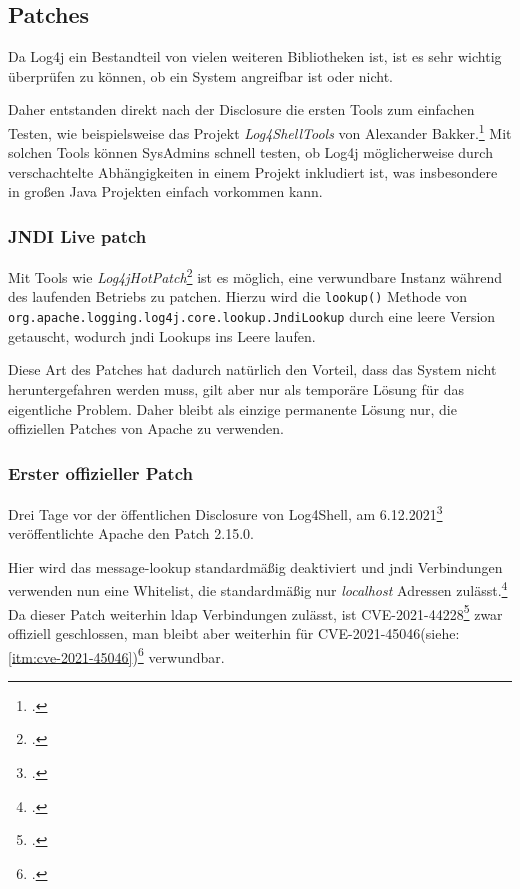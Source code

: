 
\subsection{Patches}\label{subsec:patches}
Da Log4j ein Bestandteil von vielen weiteren Bibliotheken ist, ist es sehr wichtig überprüfen zu können, ob ein System angreifbar ist oder nicht.

Daher entstanden direkt nach der Disclosure die ersten Tools zum einfachen Testen, wie beispielsweise das Projekt \textit{Log4ShellTools} von Alexander Bakker.\footcite{log4ShellTools}
Mit solchen Tools können SysAdmins schnell testen, ob Log4j möglicherweise durch verschachtelte Abhängigkeiten in einem Projekt inkludiert ist, was insbesondere in großen Java Projekten einfach vorkommen kann.

\subsubsection{JNDI Live patch}
Mit Tools wie \textit{Log4jHotPatch}\footcite{hotpatch} ist es möglich, eine verwundbare Instanz während des laufenden Betriebs zu patchen.
Hierzu wird die \verb|lookup()| Methode von \verb|org.apache.logging.log4j.core.lookup.JndiLookup| durch eine leere Version getauscht, wodurch \gls{jndi} Lookups ins Leere laufen.

Diese Art des Patches hat dadurch natürlich den Vorteil, dass das System nicht heruntergefahren werden muss, gilt aber nur als temporäre Lösung für das eigentliche Problem.
Daher bleibt als einzige permanente Lösung nur, die offiziellen Patches von Apache zu verwenden.

\subsubsection{Erster offizieller Patch}
Drei Tage vor der öffentlichen Disclosure von Log4Shell, am 6.12.2021\footcite{log4jChange} veröffentlichte Apache den Patch 2.15.0.

Hier wird das message-lookup standardmäßig deaktiviert und \gls{jndi} Verbindungen verwenden nun eine Whitelist, die standardmäßig nur \textit{localhost} Adressen zulässt.\footcite{log4jSecurity}
Da dieser Patch weiterhin \gls{ldap} Verbindungen zulässt, ist CVE-2021-44228\footcite{44228} zwar offiziell geschlossen, man bleibt aber weiterhin für CVE-2021-45046(siehe: \ref{itm:cve-2021-45046})\footcite{45046} verwundbar.

